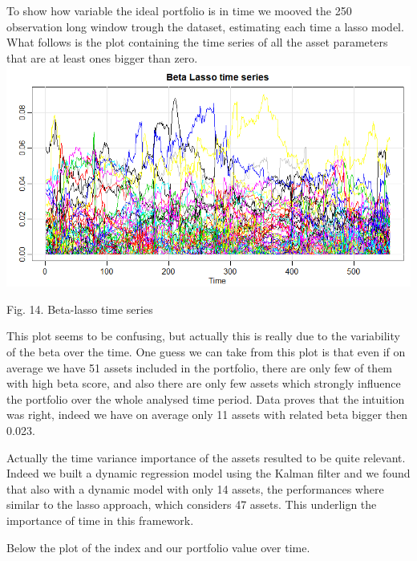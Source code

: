 \documentclass{article}%
\begin{document}
To show how variable the ideal portfolio is in time we mooved the 250 observation long window trough the dataset, estimating each time a lasso model. What follows is the plot containing the time series of all the asset parameters that are at least ones bigger than zero.
\\

\includegraphics[scale=0.55]{betatime}
\begin{center}
\begin{small}
Fig. 14. Beta-lasso time series
\\

\end{small}
\end{center}


This plot seems to be confusing, but actually this is really due to the variability of the beta over the time. One guess we can take from this plot is that even if on average we have 51 assets included in the portfolio, there are only few of them with high beta score, and also there are only few assets which strongly influence the portfolio over the whole analysed time period. Data proves that the intuition was right, indeed we have on average only 11 assets with related beta bigger then 0.023. 

Actually the time variance importance of the assets resulted to be quite relevant. Indeed we built a dynamic regression model using the Kalman filter and we found that also with a dynamic model with only 14 assets, the performances where similar to the lasso approach, which considers 47 assets. This underlign the importance of time in this framework.

Below the plot of the index and our portfolio value over time.
\\
\end{document}
